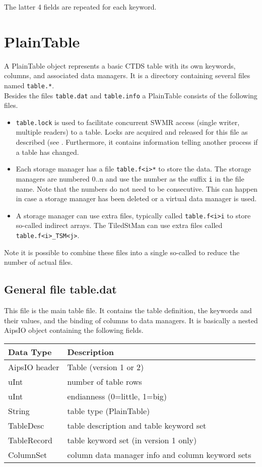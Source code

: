 The latter 4 fields are repeated for each keyword.

\section{PlainTable}
A PlainTable object represents a basic CTDS table with its own
keywords, columns, and associated data managers. It is a directory
containing several files named \texttt{table.*}.
\\Besides the files \texttt{table.dat} and \texttt{table.info} a
PlainTable consists of the following files.
\begin{itemize}
\item
\texttt{table.lock} is used to facilitate concurrent SWMR access
(single writer, multiple readers)
to a table. Locks are acquired and released for this file as described
(see .
Furthermore,
it contains information telling another process if a table has changed.
\item
Each storage manager has a file \texttt{table.f<i>*} to store
the data. The storage managers are numbered 0..n and use the number as
the suffix \texttt{i} in the file name. Note that the numbers do not
need to be consecutive. This can happen in case a storage manager has
been deleted or a virtual data manager is used.
\item
A storage manager can use extra files, typically called
\texttt{table.f<i>i} to store so-called indirect arrays.
The TiledStMan can use extra files called \texttt{table.f<i>\_TSM<j>}.
\end{itemize}
Note it is possible to combine these files into a single so-called
 to reduce the number of actual files.


\subsection{General file table.dat}
This file is the main table file. It contains the table definition,
the keywords and their values, and the binding of columns to data
managers. It is basically a nested AipsIO object containing the
following fields.

\vspace{0.15in}
\begin{tabular}{|l|l|} \hline
  Data Type & Description \\ \hline\hline
  AipsIO header & Table (version 1 or 2) \\
  uInt & number of table rows \\
  uInt & endianness (0=little, 1=big) \\
  String & table type (PlainTable) \\
  TableDesc & table description and table keyword set \\
  TableRecord & table keyword set (in version 1 only) \\
  ColumnSet & column data manager info and column keyword sets \\
  \hline
\end{tabular}
\vspace{0.15in}

